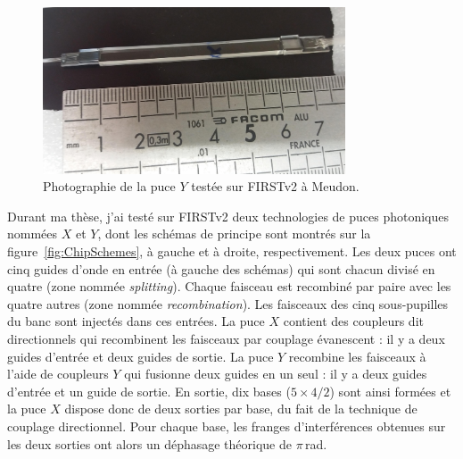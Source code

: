 \begin{figure}[ht!]
    \centering
    \includegraphics[width=0.8\textwidth]{Figure_Chap2/PhotonicChip_5T_YComb_Meudon_04_crop.jpg}
    \caption[Photographie de la puce $Y$ testée sur \ac{FIRSTv2} à Meudon.]{Photographie de la puce $Y$ testée sur \ac{FIRSTv2} à Meudon.}
    \label{fig:ChipYPhoto}
\end{figure}

Durant ma thèse, j'ai testé \citep{barjot2020} sur \ac{FIRSTv2} deux technologies de puces photoniques nommées $X$ et $Y$, dont les schémas de principe sont montrés sur la figure~\ref{fig:ChipSchemes}, à gauche et à droite, respectivement. Les deux puces ont cinq guides d'onde en entrée (à gauche des schémas) qui sont chacun divisé en quatre (zone nommée \textit{splitting}). Chaque faisceau est recombiné par paire avec les quatre autres (zone nommée \textit{recombination}). Les faisceaux des cinq sous-pupilles du banc sont injectés dans ces entrées. La puce $X$ contient des coupleurs dit directionnels qui recombinent les faisceaux par couplage évanescent : il y a deux guides d'entrée et deux guides de sortie. La puce $Y$ recombine les faisceaux à l'aide de coupleurs $Y$ qui fusionne deux guides en un seul : il y a deux guides d'entrée et un guide de sortie. En sortie, dix bases ($5 \times 4 / 2$) sont ainsi formées et la puce $X$ dispose donc de deux sorties par base, du fait de la technique de couplage directionnel. Pour chaque base, les franges d'interférences obtenues sur les deux sorties ont alors un déphasage théorique de $\pi \,$rad.

